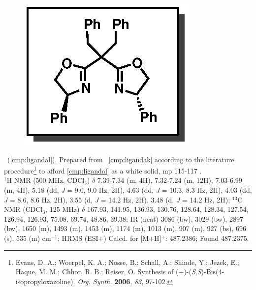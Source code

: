 \vspace{10pt}
\begin{figure}
  \vspace{-30pt}
  \begin{center}
    \includegraphics[scale=0.8]{chp_asymmetric/images/ligandal}
  \end{center}
  \vspace{-30pt}
\end{figure}
\noindent \textbf{\CMPligandal}\ (\ref{cmp:ligandal}). Prepared from \CMPligandak\ 
\ref{cmp:ligandak} according to the literature procedure\footnote{{\frenchspacing Evans, D. A.;
Woerpel, K. A.; Nosse, B.; Schall, A.; Shinde, Y.; Jezek, E.; Haque, M. M.; Chhor, R. B.;
Reiser, O. Synthesis of ($-$)-(\textit{S},\textit{S})-Bis(4-isopropyloxazoline). \textit{Org.
Synth.} \textbf{2006}, \textit{83}, 97-102.}} to afford \ref{cmp:ligandal} as a white solid, mp 115-117 \degc.
\\
$^1$H NMR (500 MHz, CDCl$_3$) $\delta$ 7.39-7.34 (m, 4H), 7.32-7.24 (m, 12H), 7.03-6.99 (m, 4H),
5.18 (dd, \textit{J} = 9.0, 9.0 Hz, 2H), 4.63 (dd, \textit{J} = 10.3, 8.3 Hz, 2H), 4.03 (dd,
\textit{J} = 8.6, 8.6 Hz, 2H), 3.55 (d, \textit{J} = 14.2 Hz, 2H), 3.48 (d, \textit{J} = 14.2 Hz, 2H); $^{13}$C NMR (CDCl$_3$, 125 MHz) $\delta$ 167.93, 141.95,
136.93, 130.76, 128.64, 128.34, 127.54, 126.94, 126.93, 75.08, 69.74, 48.86, 39.38; IR (neat) 3086
(bw), 3029 (bw), 2897 (bw), 1650 (m), 1493 (m), 1453 (m), 1174 (m), 1013 (m), 907 (m), 927 (bs), 696
(s), 535 (m) cm$^{-1}$; HRMS (ESI+) Calcd. for \ce{C33H31N2O2} [M+H]$^+$: 487.2386; Found 487.2375.

